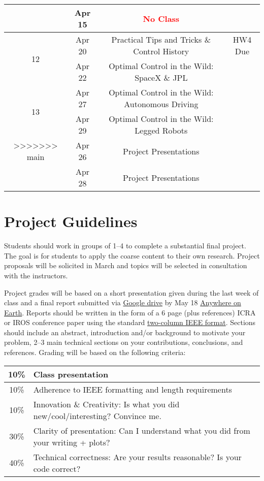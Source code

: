 \documentclass[11pt,letterpaper]{article}
\begin{document}
\begin{tabular}{c|c|c|c}
	 & Apr 15 & \textcolor{red}{No Class} &   \\
	 \hline
	\multirow{2}{*}{12}  & Apr 20 & Practical Tips and Tricks \& Control History &  HW4 Due \\
	 & Apr 22 & Optimal Control in the Wild: SpaceX \& JPL &   \\
	 \hline
	\multirow{2}{*}{13}  & Apr 27 & Optimal Control in the Wild: Autonomous Driving &  \\
	 & Apr 29 & Optimal Control in the Wild: Legged Robots &   \\
>>>>>>> main
	 \hline
	\multirow{2}{*}{14}  & Apr 26 & Project Presentations &  \\
	 & Apr 28 & Project Presentations &   \\
\end{tabular}

\section*{Project Guidelines}

Students should work in groups of 1--4 to complete a substantial final project. The goal is for students to apply the coarse content to their own research. Project proposals will be solicited in March and topics will be selected in consultation with the instructors.

\medskip
\noindent
Project grades will be based on a short presentation given during the last week of class and a final report submitted via \href{https://forms.gle/j1xhW13DuvcYLf6j7}{Google drive} by May 18 \href{https://time.is/Anywhere_on_Earth}{Anywhere on Earth}. Reports should be written in the form of a 6 page (plus references) ICRA or IROS conference paper using the standard \href{https://www.ieee.org/conferences/publishing/templates.html}{two-column IEEE format}. Sections should include an abstract, introduction and/or background to motivate your problem, 2--3 main technical sections on your contributions, conclusions, and references. Grading will be based on the following criteria:
\newline
\newline
\begin{tabular}{|c|l|}
\hline
10\% & Class presentation \\
\hline
10\% & Adherence to IEEE formatting and length requirements \\
\hline
10\% & Innovation \& Creativity: Is what you did new/cool/interesting? Convince me. \\
\hline
30\% & Clarity of presentation: Can I understand what you did from your writing + plots? \\
\hline
40\% & Technical correctness: Are your results reasonable? Is your code correct? \\
\hline	
\end{tabular}
\end{document}
